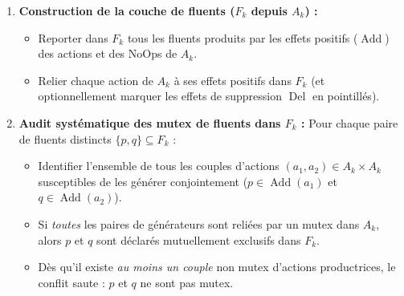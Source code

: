 \begin{proposition}
\begin{enumerate}
\begin{enumerate}
\begin{itemize}
                \item \emph{Besoins concurrents (conflit hérité) :} Vérifier s'il existe une paire $(p, q) \in \operatorname{Prec}(a_1) \times \operatorname{Prec}(a_2)$ telle que $\operatorname{Mutex}(p, q)$ dans $F_{k-1}$.
                \item Si au moins une condition est satisfaite, tracer un lien d'exclusion mutuelle entre $a_1$ et $a_2$.
            \end{itemize}

            \item \textbf{Construction de la couche de fluents ($F_k$ depuis $A_k$) :}
            \begin{itemize}
                \item Reporter dans $F_k$ tous les fluents produits par les effets positifs ($\operatorname{Add}$) des actions et des NoOps de $A_k$.
                \item Relier chaque action de $A_k$ à ses effets positifs dans $F_k$ (et optionnellement marquer les effets de suppression $\operatorname{Del}$ en pointillés).
            \end{itemize}

            \item \textbf{Audit systématique des mutex de fluents dans $F_k$ :}
            Pour chaque paire de fluents distincts $\{p, q\} \subseteq F_k$ :
            \begin{itemize}
                \item Identifier l'ensemble de tous les couples d'actions $(a_1, a_2) \in A_k \times A_k$ susceptibles de les générer conjointement ($p \in \operatorname{Add}(a_1)$ et $q \in \operatorname{Add}(a_2)$).
                \item Si \emph{toutes} les paires de générateurs sont reliées par un mutex dans $A_k$, alors $p$ et $q$ sont déclarés mutuellement exclusifs dans $F_k$.
                \item Dès qu'il existe \emph{au moins un couple} non mutex d'actions productrices, le conflit saute : $p$ et $q$ ne sont pas mutex.
            \end{itemize}
        \end{enumerate}


\end{enumerate}
\end{proposition}

